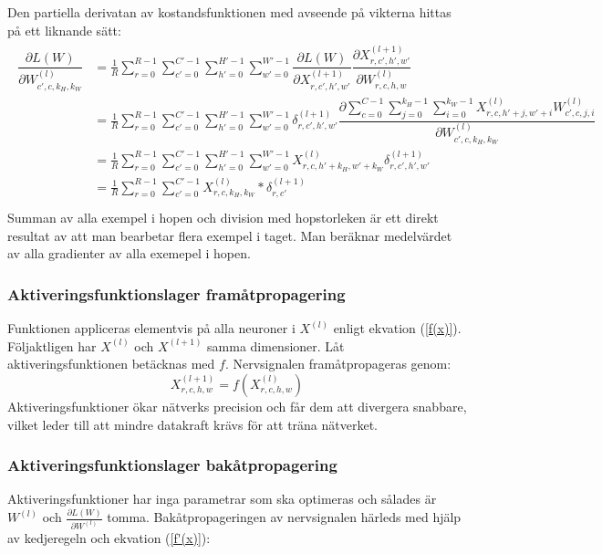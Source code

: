 \documentclass[a4paper,11pt,twoside]{article}
\newcommand*{\pd}[2]{\ensuremath{\dfrac{\partial #1}{\partial #2}}}
\newcommand*{\inpd}[2]{\ensuremath{\frac{\partial #1}{\partial #2}}}
\begin{document}
Den partiella derivatan av kostandsfunktionen med avseende på vikterna hittas på ett liknande sätt: \cite{webconv1} \cite{webconv2} \cite{webconv3}
\begin{align}
\begin{split}
	\pd{L(W)}{W^{(l)}_{c',c,k_H,k_W}}
		& = \frac{1}{R}\sum^{R-1}_{r=0} \sum^{C'-1}_{c'=0} \sum^{H'-1}_{h'=0} \sum^{W'-1}_{w'=0} \pd{L(W)}{X^{(l+1)}_{r,c',h',w'}} \pd{X^{(l+1)}_{r,c',h',w'}}{W^{(l)}_{r,c,h,w}} \\
		& = \frac{1}{R}\sum^{R-1}_{r=0} \sum_{c'=0}^{C'-1} \sum^{H'-1}_{h'=0} \sum^{W'-1}_{w'=0} \delta^{(l+1)}_{r,c',h',w'} \pd{\sum\limits^{C-1}_{c=0} \sum\limits^{k_H-1}_{j=0} \sum\limits^{k_W-1}_{i=0} X^{(l)}_{r, c, h'+j, w'+i}W^{(l)}_{c', c, j, i}}{W^{(l)}_{c',c,k_H,k_W}} \\
		& = \frac{1}{R}\sum^{R-1}_{r=0} \sum^{C'-1}_{c'=0} \sum^{H'-1}_{h'=0} \sum^{W'-1}_{w'=0} X^{(l)}_{r, c, h'+k_H, w'+k_W} \delta^{(l+1)}_{r,c',h',w'} \\
		& = \frac{1}{R}\sum^{R-1}_{r=0} \sum^{C'-1}_{c'=0} X^{(l)}_{r, c, k_H, k_W} * \delta^{(l+1)}_{r,c'} \\
\end{split}
\end{align}
Summan av alla exempel i hopen och division med hopstorleken är ett direkt resultat av att man bearbetar flera exempel i taget. Man beräknar medelvärdet av alla gradienter av alla exemepel i hopen. \cite{cs231n} 

\subsubsection{Aktiveringsfunktionslager framåtpropagering}
Funktionen appliceras elementvis på alla neuroner i $X^{(l)}$ enligt ekvation (\ref{f(x)}). Följaktligen har $X^{(l)}$ och $X^{(l+1)}$ samma dimensioner. Låt aktiveringsfunktionen betäcknas med $f$. Nervsignalen framåtpropageras genom: \cite{convmath}
\begin{equation}
X^{(l+1)}_{r,c,h,w} = f(X^{(l)}_{r,c,h,w})
\end{equation}
Aktiveringsfunktioner ökar nätverks precision och får dem att divergera snabbare, vilket leder till att mindre datakraft krävs för att träna nätverket. \cite{cs231n}

\subsubsection{Aktiveringsfunktionslager bakåtpropagering}
Aktiveringsfunktioner har inga parametrar som ska optimeras och sålades är $W^{(l)}$ och $\inpd{L(W)}{W^{(l)}}$ tomma. Bakåtpropageringen av nervsignalen härleds med hjälp av kedjeregeln och ekvation (\ref{f'(x)}): \cite{cs231n} \cite{convmath}
\end{document}
